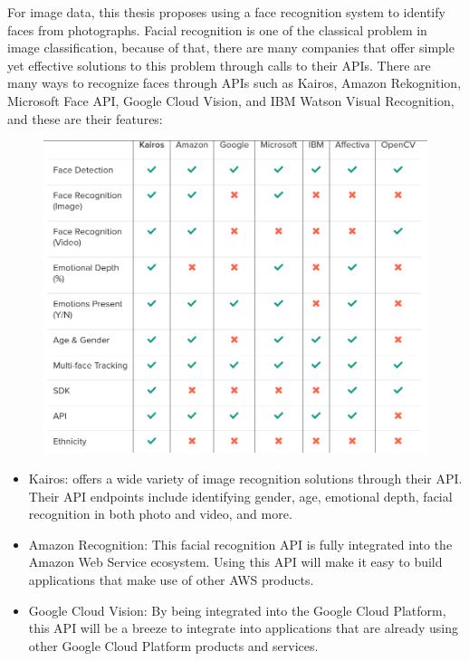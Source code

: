 For image data, this thesis proposes using a face recognition system to identify faces from photographs. Facial recognition is one of the classical problem in image classification, because of that, there are many companies that offer simple yet effective solutions to this problem through calls to their APIs. There are many ways to recognize faces through APIs such as Kairos, Amazon Rekognition, Microsoft Face API, Google Cloud Vision, and IBM Watson Visual Recognition, and these are their features:
\begin{center}
	\begin{figure}[H]
		\centering
		\includegraphics[width=1\columnwidth]{images/chap3/face_api.png}
		\label{chap3:face_api_now}
	\end{figure}
\end{center}
\begin{itemize}
	\item  Kairos: offers a wide variety of image recognition solutions through their API. Their API endpoints include identifying gender, age, emotional depth, facial recognition in both photo and video, and more.
	\item Amazon Recognition: This facial recognition API is fully integrated into the Amazon Web Service ecosystem. Using this API will make it easy to build applications that make use of other AWS products.
	\item Google Cloud Vision: By being integrated into the Google Cloud Platform, this API will be a breeze to integrate into applications that are already using other Google Cloud Platform products and services.
\end{itemize}

